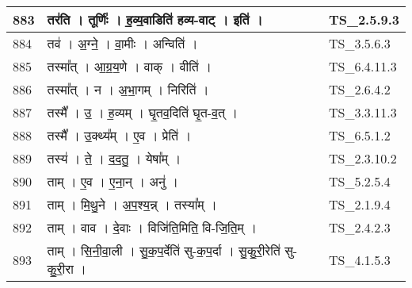 \documentclass[17pt]{extarticle}
\begin{document}
\begin{longtable}{||p{0.4in}||p{4.9in}||p{0.9in}||}
    883 & तर॑ति   ।   तूर्णिः॑   ।   ह॒व्य॒वाडिति॑ हव्य{-}वाट्   ।   इति॑   ।    & TS\_2.5.9.3       \\
    
    \hline
        
    884 & तव॑   ।   अ॒ग्ने॒   ।   वा॒मीः   ।   अन्विति॑   ।    & TS\_3.5.6.3       \\
    
    \hline
        
    885 & तस्मा᳚त्   ।   आ॒ग्र॒य॒णे   ।   वाक्   ।   वीति॑   ।    & TS\_6.4.11.3       \\
    
    \hline
        
    886 & तस्मा᳚त्   ।   न   ।   अ॒भा॒गम्   ।   निरिति॑   ।    & TS\_2.6.4.2       \\
    
    \hline
        
    887 & तस्मै᳚   ।   उ॒   ।   ह॒व्यम्   ।   घृ॒तव॒दिति॑ घृ॒त{-}व॒त्   ।    & TS\_3.3.11.3       \\
    
    \hline
        
    888 & तस्मै᳚   ।   उ॒क्थ्य᳚म्   ।   ए॒व   ।   प्रेति॑   ।    & TS\_6.5.1.2       \\
    
    \hline
        
    889 & तस्य॑   ।   ते॒   ।   द॒द॒तु॒   ।   येषा᳚म्   ।    & TS\_2.3.10.2       \\
    
    \hline
        
    890 & ताम्   ।   ए॒व   ।   ए॒ना॒न्   ।   अनु॑   ।    & TS\_5.2.5.4       \\
    
    \hline
        
    891 & ताम्   ।   मि॒थु॒ने   ।   अ॒प॒श्य॒न्न्   ।   तस्या᳚म्   ।    & TS\_2.1.9.4       \\
    
    \hline
        
    892 & ताम्   ।   वाव   ।   दे॒वाः   ।   विजि॑ति॒मिति॒ वि{-}जि॒ति॒म्   ।    & TS\_2.4.2.3       \\
    
    \hline
        
    893 & ताम्   ।   सि॒नी॒वा॒ली   ।   सु॒क॒प॒र्देति॑ सु{-}क॒प॒र्दा   ।   सु॒कु॒री॒रेति॑ सु{-}कु॒री॒रा   ।    & TS\_4.1.5.3       \\
    
    \hline
        

\end{longtable}
\end{document}
